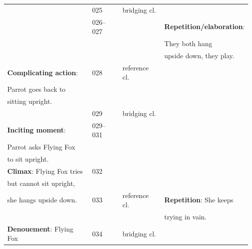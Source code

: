 \documentclass[output=paper]{LSP/langsci}
\begin{document}
{\begin{longtable}{llll}
                                       & 025               & bridging cl. &                                              \\
                                           & 026--027          &                 & \textbf{Repetition/elaboration}:       \\
                                       &                   &                 & They both hang                      \\
                                           &                   &                 & upside down, they play.                      \\                                   
\textbf{Complicating action}:                & 028               &  reference cl.               &                                              \\
Parrot goes back to                  &                   &                 &                                              \\
sitting upright.                       &                   &                 &                                              \\
                                      & 029               & bridging cl. &                                              \\
\textbf{Inciting moment}:                       & 029--031          &                 &                                              \\
Parrot asks Flying Fox                   &                   &                 &                                              \\
to sit upright.                         &                   &                 &                                              \\
\textbf{Climax}: Flying Fox tries                  & 032               &                 &                                              \\
but cannot sit upright,                 &                   &                 &                                              \\
she hangs upside down.                  & 033               &   reference cl.              & \textbf{Repetition}: She keeps         \\
                                            &              &                 &  trying in vain.        \\
\textbf{Denouement}: Flying Fox                   & 034               & bridging cl. &                                              \\

\end{longtable}}
\end{document}
